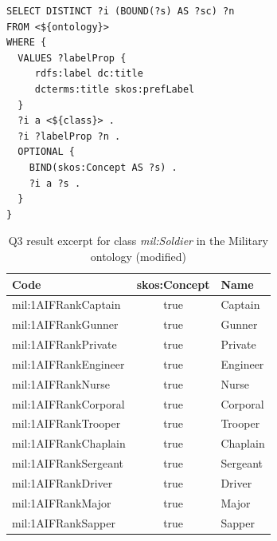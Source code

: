 \begin{lstlisting}[captionpos=b, caption=Q3 -- Query to get a list of candidate code list members and whether it's a \textit{skos:Concept},label=lst:sparql3,basicstyle=\ttfamily,frame=single]
SELECT DISTINCT ?i (BOUND(?s) AS ?sc) ?n
FROM <${ontology}> 
WHERE {
  VALUES ?labelProp { 
     rdfs:label dc:title
     dcterms:title skos:prefLabel
  }
  ?i a <${class}> .
  ?i ?labelProp ?n . 
  OPTIONAL {
    BIND(skos:Concept AS ?s) .
    ?i a ?s .
  }
}
\end{lstlisting}

\begin{table}[h]
\footnotesize
\centering
\begin{tabular}{|l|c|l|}
\hline
\textbf{Code} & \textbf{skos:Concept} & \textbf{Name} \\ \hline
mil:1AIFRankCaptain       & true                   & Captain       \\ \hline
mil:1AIFRankGunner        & true                   & Gunner        \\ \hline
mil:1AIFRankPrivate       & true                   & Private       \\ \hline
mil:1AIFRankEngineer      & true                   & Engineer      \\ \hline
mil:1AIFRankNurse         & true                   & Nurse         \\ \hline
mil:1AIFRankCorporal      & true                   & Corporal      \\ \hline
mil:1AIFRankTrooper       & true                   & Trooper       \\ \hline
mil:1AIFRankChaplain      & true                   & Chaplain      \\ \hline
mil:1AIFRankSergeant      & true                   & Sergeant      \\ \hline
mil:1AIFRankDriver        & true                   & Driver        \\ \hline
mil:1AIFRankMajor         & true                   & Major         \\ \hline
mil:1AIFRankSapper        & true                   & Sapper        \\ \hline
\end{tabular}
\caption{Q3 result excerpt for class \textit{mil:Soldier} in the Military ontology (modified)} \label{tab:q3-results}
\end{table}


